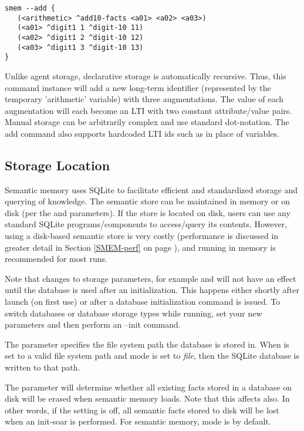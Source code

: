 \begin{verbatim}
smem --add {
   (<arithmetic> ^add10-facts <a01> <a02> <a03>)
   (<a01> ^digit1 1 ^digit-10 11)
   (<a02> ^digit1 2 ^digit-10 12)
   (<a03> ^digit1 3 ^digit-10 13)
}
\end{verbatim}

Unlike agent storage, declarative storage is automatically recursive.  
Thus, this command instance will add a new long-term identifier (represented by the temporary 'arithmetic' variable) with three augmentations.  
The value of each augmentation will each become an LTI with two constant attribute/value pairs.  
Manual storage can be arbitrarily complex and use standard dot-notation.
The add command also supports hardcoded LTI ids such as  in place of variables.

\subsection{Storage Location}
Semantic memory uses SQLite to facilitate efficient and standardized storage and querying of knowledge.  
The semantic store can be maintained in memory or on disk (per the  and  parameters). 
If the store is located on disk, users can use any standard SQLite programs/components to access/query its contents.
However, using a disk-based semantic store is very costly (performance is discussed in greater detail in Section \ref{SMEM-perf} on page \pageref{SMEM-perf}), and running in memory is recommended for most runs.

Note that changes to storage parameters, for example  and  will not have an effect until the database is used after an initialization. This happens either shortly after launch (on first use) or after a database initialization command is issued. To switch databases or database storage types while running, set your new parameters and then perform an --init command.

The  parameter specifies the file system path the database is stored in. When  is set to a valid file system path and  mode is set to \emph{file}, then the SQLite database is written to that path.

The  parameter will determine whether all existing facts stored in a database on disk will be erased when semantic memory loads. Note that this affects  also.  In other words, if the  setting is off, all semantic facts stored to disk will be lost when an init-soar is performed. For semantic memory,  mode is  by default.

